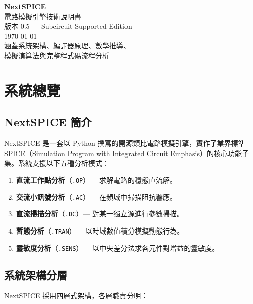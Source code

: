 \documentclass[12pt,a4paper]{article}
\begin{document}
\begin{titlepage}
\centering
\vspace*{3cm}
{\Huge\bfseries NextSPICE}\\[0.5cm]
{\LARGE 電路模擬引擎技術說明書}\\[2cm]
{\large 版本 0.5 --- Subcircuit Supported Edition}\\[1cm]
{\large\today}\\[3cm]
{\large
涵蓋系統架構、編譯器原理、數學推導、\\
模擬演算法與完整程式碼流程分析
}
\vfill
\end{titlepage}

\tableofcontents
\newpage

\section{系統總覽}

\subsection{NextSPICE 簡介}

NextSPICE 是一套以 Python 撰寫的開源類比電路模擬引擎，實作了業界標準 SPICE（Simulation Program with Integrated Circuit Emphasis）的核心功能子集。系統支援以下五種分析模式：

\begin{enumerate}[label=(\arabic*)]
  \item \textbf{直流工作點分析}（\texttt{.OP}）--- 求解電路的穩態直流解。
  \item \textbf{交流小訊號分析}（\texttt{.AC}）--- 在頻域中掃描阻抗響應。
  \item \textbf{直流掃描分析}（\texttt{.DC}）--- 對某一獨立源進行參數掃描。
  \item \textbf{暫態分析}（\texttt{.TRAN}）--- 以時域數值積分模擬動態行為。
  \item \textbf{靈敏度分析}（\texttt{.SENS}）--- 以中央差分法求各元件對增益的靈敏度。
\end{enumerate}

\subsection{系統架構分層}

NextSPICE 採用四層式架構，各層職責分明：
\end{document}
